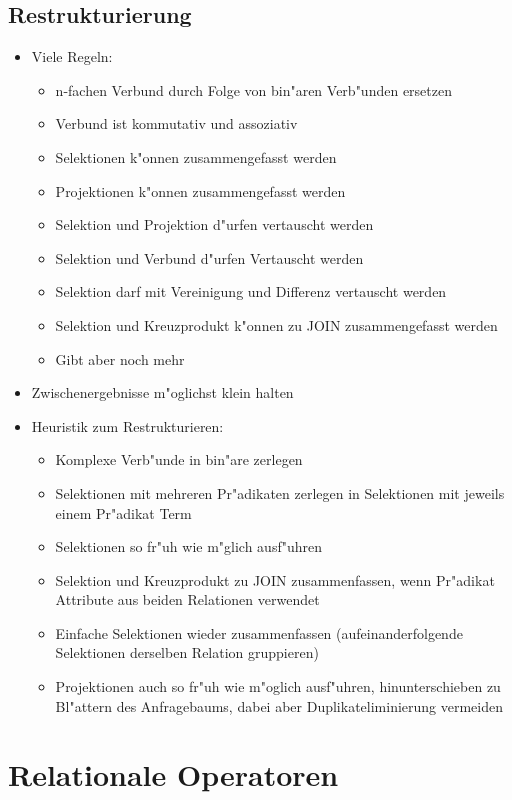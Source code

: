 \documentclass[a4paper, 12pt]{scrartcl}
\begin{document}
\subsection{Restrukturierung}
\begin{itemize}
	\item
		Viele Regeln:
		\begin{itemize}
			\item
				n-fachen Verbund durch Folge von bin"aren Verb"unden ersetzen
			\item
				Verbund ist kommutativ und assoziativ
			\item
				Selektionen k"onnen zusammengefasst werden
			\item
				Projektionen k"onnen zusammengefasst werden
			\item
				Selektion und Projektion d"urfen vertauscht werden
			\item
				Selektion und Verbund d"urfen Vertauscht werden
			\item
				Selektion darf mit Vereinigung und Differenz vertauscht werden
			\item
				Selektion und Kreuzprodukt k"onnen zu JOIN zusammengefasst werden
			\item
				Gibt aber noch mehr
		\end{itemize}
	\item
		Zwischenergebnisse m"oglichst klein halten
	\item
		Heuristik zum Restrukturieren:
		\begin{itemize}
			\item
				Komplexe Verb"unde in bin"are zerlegen
			\item
				Selektionen mit mehreren Pr"adikaten zerlegen in Selektionen mit jeweils einem Pr"adikat Term
			\item
				Selektionen so fr"uh wie m"glich ausf"uhren
			\item
				Selektion und Kreuzprodukt zu JOIN zusammenfassen, wenn Pr"adikat Attribute aus beiden Relationen verwendet
			\item
				Einfache Selektionen wieder zusammenfassen (aufeinanderfolgende Selektionen derselben Relation gruppieren)
			\item
				Projektionen auch so fr"uh wie m"oglich ausf"uhren, hinunterschieben zu Bl"attern des Anfragebaums, dabei aber Duplikateliminierung vermeiden
		\end{itemize}
\end{itemize}


\section{Relationale Operatoren}
\end{document}
